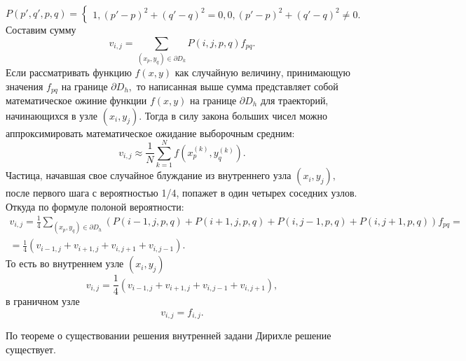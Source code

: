 \documentclass[11pt]{article}
\numberwithin{equation}{section}
\begin{document}
\begin{equation*}
  P(p',q', p, q) = 
  \begin{cases}
    1, (p'-p)^2 + (q'-q)^2 =0,
    0, (p'-p)^2 +(q'-q)^2 \not = 0.
  \end{cases}
\end{equation*}
Составим сумму 
$$ v_{i,j} = \sum_{(x_p,y_q) \in \partial D_k} P(i,j,p,q) f_{pq}.$$
Если рассматривать функцию $f(x,y)$ как случайную величину, принимающую значения
$f_{pq}$ на границе $\partial D_h,$ то написанная выше сумма представляет собой математическое ожиние функции 
$f(x,y)$ на границе  $\partial D_h$ для траекторий, начинающихся в узле $(x_i,y_j).$
Тогда в силу закона больших чисел можно аппроксимировать математическое ожидание выборочным средним:
$$ v_{i,j} \approx \frac{1}{N} \sum_{k=1}^{N} f(x_p^{(k)},y_q^{(k)}).$$
Частица, начавшая свое случайное блуждание из внутреннего узла $(x_i,y_j),$ после первого шага с вероятностью 1/4, попажет в один 
четырех соседних узлов. Откуда по формуле полоной вероятности:
\begin{eqnarray}
  v_{i,j} = \frac{1}{4} \sum_{(x_p, y_q)\in \partial D_h} (  P(i-1,j,p,q) +P(i+1,j,p,q) +P(i,j-1,p,q)+P(i, j+1,p,q)    )f_{pq}=\\
  = \frac{1}{4}(v_{i-1,j}+v_{i+1,j}+v_{i,j+1}+v_{i,j-1}).
\end{eqnarray}
То есть во внутреннем узле $(x_i, y_j)$
$$ v_{i,j} = \frac{1}{4} (v_{i-1,j}+v_{i+1,j} + v_{i,j-1} + v_{i,j+1}),$$
в граничном узле 
$$ v_{i,j} = f_{i,j}.$$

По теореме о существовании решения внутренней задани Дирихле решение существует.
\end{document}
